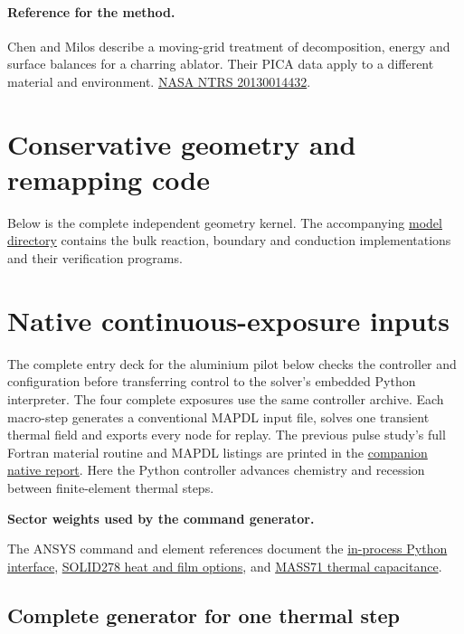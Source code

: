\documentclass[11pt]{article}
\begin{document}
\clearpage

\paragraph{Reference for the method.}
Chen and Milos describe a moving-grid treatment of decomposition, energy and
surface balances for a charring ablator. Their PICA data apply to a different
material and environment.
\href{https://ntrs.nasa.gov/citations/20130014432}{NASA NTRS 20130014432}.

\clearpage\appendix\section{Conservative geometry and remapping code}
Below is the complete independent geometry kernel. The accompanying
\href{https://github.com/MDNich/MIT-RT-26_27-Work/tree/main/simulation_work/solidprop/iris/v1/model}{model directory}
contains the bulk reaction, boundary and conduction implementations and
their verification programs.

\clearpage\section{Native continuous-exposure inputs}
The complete entry deck for the aluminium pilot below checks the controller
and configuration before transferring control to the solver's embedded Python
interpreter. The four complete exposures use the same controller archive.
Each macro-step generates a conventional MAPDL input file, solves one transient
thermal field and exports every node for replay. The previous pulse study's
full Fortran material routine and MAPDL listings are printed in the
\href{https://github.com/MDNich/MIT-RT-26_27-Work/blob/main/simulation_work/solidprop/iris/v1/output/pdf/iris_phenolic_report.pdf}{companion native report}.
Here the Python controller advances chemistry and recession between finite-element
thermal steps.

\medskip\noindent\textbf{Sector weights used by the command generator.}\par\smallskip

The ANSYS command and element references document the
\href{https://ansyshelp.ansys.com/public/Views/Secured/corp/v251/en/ans_cmd/Hlp_C_PYTHON_a.html}{in-process Python interface},
\href{https://ansyshelp.ansys.com/public/views/secured/corp/v261/en/ans_elem/Hlp_E_SOLID278.html}{SOLID278 heat and film options}, and
\href{https://ansyshelp.ansys.com/public/views/secured/corp/v261/en/ans_elem/Hlp_E_MASS71.html}{MASS71 thermal capacitance}.
\clearpage
\subsection*{Complete generator for one thermal step}

\end{document}
